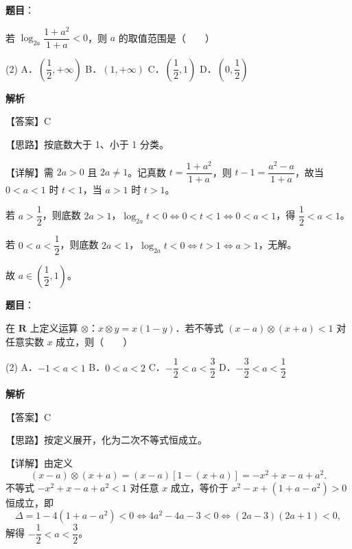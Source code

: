 \begin{answer}

\textbf{题目}：

若 $\log_{2a}\dfrac{1+a^2}{1+a} < 0$，则 $a$ 的取值范围是\mbox{（　　）}

\begin{gkopts}(2)
\task A．$\left(\dfrac{1}{2}, +\infty\right)$
\task B．$(1, +\infty)$
\task C．$\left(\dfrac{1}{2}, 1\right)$
\task D．$\left(0, \dfrac{1}{2}\right)$
\end{gkopts}

\textbf{解析}

【答案】C

【思路】按底数大于 1、小于 1 分类。

【详解】需 $2a > 0$ 且 $2a \neq 1$。记真数 $t = \dfrac{1+a^2}{1+a}$，则 $t - 1 = \dfrac{a^2-a}{1+a}$，故当 $0 < a < 1$ 时 $t < 1$，当 $a > 1$ 时 $t > 1$。

若 $a > \dfrac{1}{2}$，则底数 $2a > 1$，$\log_{2a} t < 0 \iff 0 < t < 1 \iff 0 < a < 1$，得 $\dfrac{1}{2} < a < 1$。

若 $0 < a < \dfrac{1}{2}$，则底数 $2a < 1$，$\log_{2a} t < 0 \iff t > 1 \iff a > 1$，无解。

故 $a \in \left(\dfrac{1}{2}, 1\right)$。


\end{answer}
\begin{answer}

\textbf{题目}：

在 $\mathbf{R}$ 上定义运算 $\otimes$：$x \otimes y = x(1-y)$．若不等式 $(x-a) \otimes (x+a) < 1$ 对任意实数 $x$ 成立，则\mbox{（　　）}

\begin{gkopts}(2)
\task A．$-1 < a < 1$
\task B．$0 < a < 2$
\task C．$-\dfrac{1}{2} < a < \dfrac{3}{2}$
\task D．$-\dfrac{3}{2} < a < \dfrac{1}{2}$
\end{gkopts}

\textbf{解析}

【答案】C

【思路】按定义展开，化为二次不等式恒成立。

【详解】由定义
\nopagebreak[4]
\[
(x-a) \otimes (x+a) = (x-a)\left[1-(x+a)\right] = -x^2 + x - a + a^2.
\]
不等式 $-x^2+x-a+a^2 < 1$ 对任意 $x$ 成立，等价于 $x^2 - x + (1+a-a^2) > 0$ 恒成立，即
\nopagebreak[4]
\[
\Delta = 1 - 4(1+a-a^2) < 0 \iff 4a^2 - 4a - 3 < 0 \iff (2a-3)(2a+1) < 0,
\]
解得 $-\dfrac{1}{2} < a < \dfrac{3}{2}$。


\end{answer}
